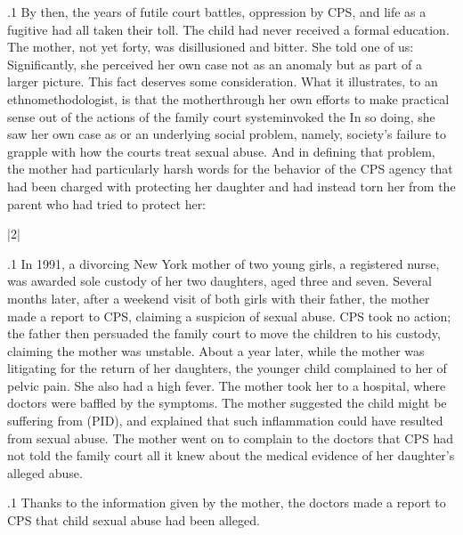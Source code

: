 \documentclass[11pt, twoside]{article}
\begin{document}
{\p.1{%
By then, the years of futile court battles, oppression by CPS, and life as
a fugitive had all taken their toll. The child had never received a formal
education. The mother, not yet forty, was disillusioned and bitter. She
told one of us: 
Significantly, she perceived her own case not as an anomaly but as
part of a larger picture. This fact deserves some consideration. What
it illustrates, to an ethnomethodologist, is that the mother\mdash{}through
her own efforts to make practical sense out of the actions of the family
court system\mdash{}invoked the  In
so doing, she saw her own case as  or  an
underlying social problem, namely, society's failure to grapple with how
the courts treat sexual abuse. And in defining that problem, the mother
had particularly harsh words for the behavior of the CPS agency that
had been charged with protecting her daughter and had instead torn
her from the parent who had tried to protect her: 
}%


\s|2|{}

\p.1{%
\noindent{}In 1991, a divorcing New York mother of two young girls, a registered
nurse, was awarded sole custody of her two daughters, aged three and
seven. Several months later, after a weekend visit of both
girls with their father, the mother made a report to CPS, claiming a suspicion of sexual
abuse. CPS took no action; the father then persuaded the family court
to move the children to his custody, claiming the mother was unstable.
About a year later, while the mother was litigating for the return of her
daughters, the younger child complained to her of pelvic pain. She also
had a high fever. The mother took her to a hospital, where doctors were
baffled by the symptoms. The mother suggested the child might be suffering
from  (PID), and explained that
such inflammation could have resulted from sexual abuse. The mother
went on to complain to the doctors that CPS had not told the family
court all it knew about the medical evidence of her daughter's alleged
abuse.
}%

\p.1{%
Thanks to the information given by the mother, the doctors made a
report to CPS that child sexual abuse had been alleged.
}%

}
\end{document}
